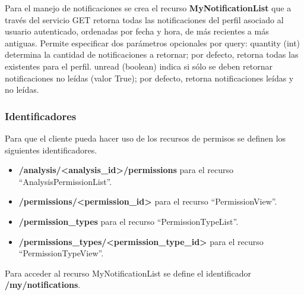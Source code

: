 Para el manejo de notificaciones se crea el recurso \textbf{MyNotificationList} que a través del servicio GET retorna todas las notificaciones del perfil asociado al usuario autenticado, ordenadas por fecha y hora, de más recientes a más antiguas. Permite especificar dos parámetros opcionales por query: quantity (int) determina la cantidad de notificaciones a retornar; por defecto, retorna todas las existentes para el perfil. unread (boolean) indica si sólo se deben retornar notificaciones no leídas (valor True); por defecto, retorna notificaciones leídas y no leídas.

\subsubsection{Identificadores}

	Para que el cliente pueda hacer uso de los recursos de permisos se definen los siguientes identificadores.
	\begin{itemize}
		\item \textbf{/analysis/<analysis\_id>/permissions} para el recurso ``AnalysisPermissionList''.
		\item \textbf{/permissions/<permission\_id>} para el recurso ``PermissionView''.
		\item \textbf{/permission\_types} para el recurso ``PermissionTypeList''.
		\item \textbf{/permissions\_types/<permission\_type\_id>} para el recurso ``PermissionTypeView''.
	\end{itemize}
	
	Para acceder al recurso MyNotificationList se define el identificador \textbf{/my/notifications}.

